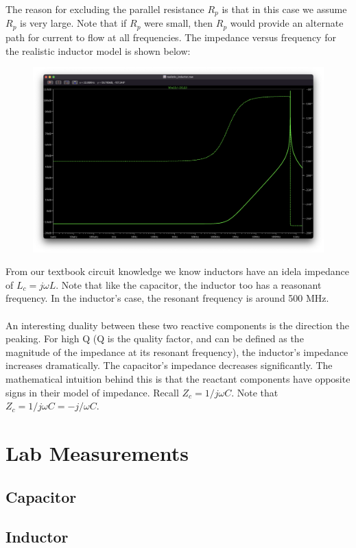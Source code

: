 \documentclass{article}
\begin{document}
The reason for excluding the parallel resistance $R_p$ is that in this case we assume $R_p$ is very large. Note that if $R_p$ were small, then $R_p$ would provide an alternate path for current to flow at all frequencies.
The impedance versus frequency for the realistic inductor model is shown below:
\begin{figure}[H]
    \includegraphics[width=\textwidth]{images/ltspice_realistic_inductor.png}
\end{figure}

From our textbook circuit knowledge we know inductors have an idela impedance of $L_c = j\omega L$.
Note that like the capacitor, the inductor too has a reasonant frequency. In the inductor's case, the resonant frequency is around 500 MHz. 
\\\\
An interesting duality between these two reactive components is the direction the peaking. For high Q (Q is the quality factor, and can be defined as the magnitude of the impedance at its resonant frequency), the inductor's impedance increases dramatically. The capacitor's impedance decreases significantly.
The mathematical intuition behind this is that the reactant components have opposite signs in their model of impedance. Recall $Z_c = 1/j\omega C$. Note that $Z_c = 1/j\omega C = -j/\omega C$.

\pagebreak

\section*{Lab Measurements}
\subsection*{Capacitor}
\subsection*{Inductor}
\end{document}
